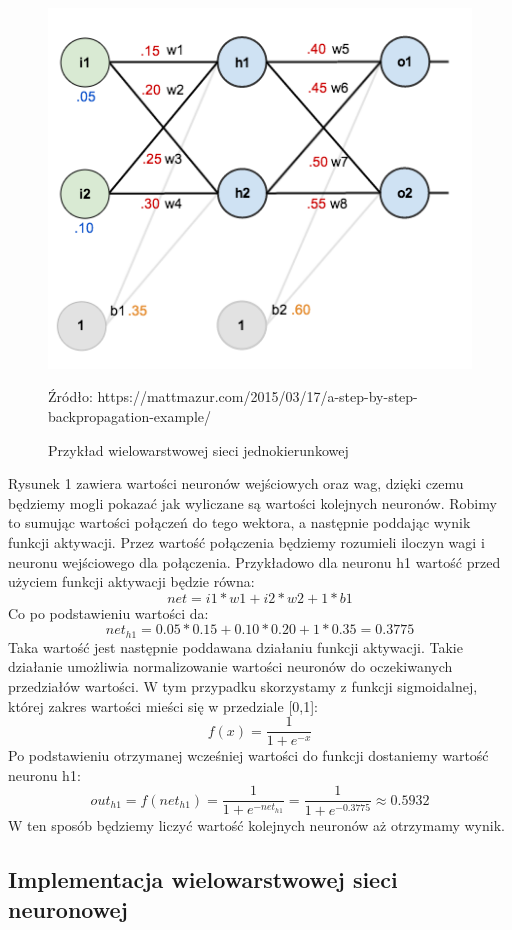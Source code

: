 \documentclass[12pt]{article}
\newcommand{\source}[1]{{\centerline{\tiny Źródło: #1}}}
\begin{document}
\begin{figure}[!ht]
    \includegraphics[width=\linewidth]{images/feed-forward-diagram.png}
    \source{https://mattmazur.com/2015/03/17/a-step-by-step-backpropagation-example/}
    \caption{Przykład wielowarstwowej sieci jednokierunkowej}
\end{figure}

Rysunek 1 zawiera wartości neuronów wejściowych oraz wag, dzięki czemu będziemy mogli pokazać jak wyliczane są wartości kolejnych neuronów.
Robimy to sumując wartości połączeń do tego wektora, a następnie poddając wynik funkcji aktywacji.
Przez wartość połączenia będziemy rozumieli iloczyn wagi i neuronu wejściowego dla połączenia.
Przykładowo dla neuronu h1 wartość przed użyciem funkcji aktywacji będzie równa:
\[
  net = i1*w1+i2*w2+1*b1
\]
Co po podstawieniu wartości da:
\[
  net_{h1} = 0.05*0.15+0.10*0.20+1*0.35=0.3775
\]
Taka wartość jest następnie poddawana działaniu funkcji aktywacji. 
Takie działanie umożliwia normalizowanie wartości neuronów do oczekiwanych przedziałów wartości.
W tym przypadku skorzystamy z funkcji sigmoidalnej, której zakres wartości mieści się w przedziale [0,1]:
\[
    f(x) =  \frac{\mathrm{1} }{\mathrm{1} + e^{-x} } 
\]
Po podstawieniu otrzymanej wcześniej wartości do funkcji dostaniemy wartość neuronu h1:
\[
    out_{h1} 
    = f(net_{h1}) 
    =  \frac{\mathrm{1} }{\mathrm{1} + e^{-net_{h1}} } 
    =  \frac{\mathrm{1} }{\mathrm{1} + e^{-0.3775} } \approx 0.5932
\]
W ten sposób będziemy liczyć wartość kolejnych neuronów aż otrzymamy wynik.

\subsection{Implementacja wielowarstwowej sieci neuronowej}
\end{document}
